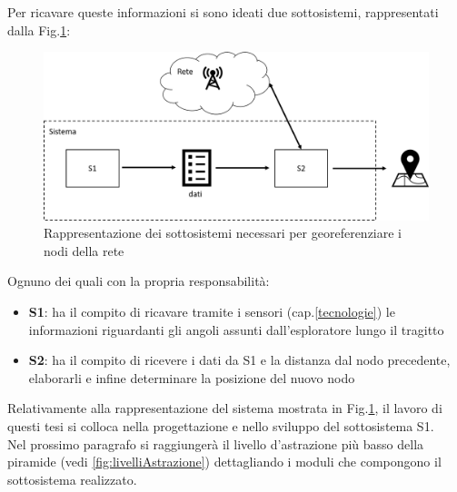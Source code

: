 Per ricavare queste informazioni si sono ideati due sottosistemi, rappresentati dalla Fig.\ref{fig:sistema_liv1}:
\begin{figure}[H]
	\centering
	\includegraphics[scale=0.3]{DescrizioneDelSistema/sistema_liv1.png}
	\caption{Rappresentazione dei sottosistemi necessari per georeferenziare i nodi della rete }
	\label{fig:sistema_liv1}
\end{figure}
Ognuno dei quali con la propria responsabilità:
\begin{itemize}
	\item \textbf{S1}: ha il compito di ricavare tramite i sensori (cap.\ref{tecnologie}) le informazioni riguardanti gli angoli assunti dall'esploratore lungo il tragitto
	\item \textbf{S2}: ha il compito di ricevere i dati da S1 e la distanza dal nodo precedente, elaborarli e infine determinare la posizione del nuovo nodo
\end{itemize}

Relativamente alla rappresentazione del sistema mostrata in Fig.\ref{fig:sistema_liv1}, il lavoro di questi tesi si colloca nella progettazione e nello sviluppo del sottosistema S1.\\
Nel prossimo paragrafo si raggiungerà il livello d'astrazione più basso della piramide (vedi \ref{fig:livelliAstrazione}) dettagliando i moduli che compongono il sottosistema realizzato.\newpage


